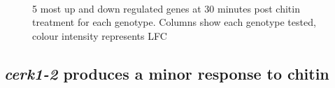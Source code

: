 \documentclass[../main.tex]{subfiles}
\begin{document}
\begin{figure}[!ht]
  \centering
  \\
  \caption[Most differential genes at 30 minutes post-chitin treatment]{5 most up and down regulated genes at 30 minutes post chitin
    treatment for each genotype. Columns show each genotype tested, colour intensity represents LFC}
  \label{fig:DEG5}
\end{figure}


\subsection{\textit{cerk1-2} produces a minor response to chitin}
\end{document}
